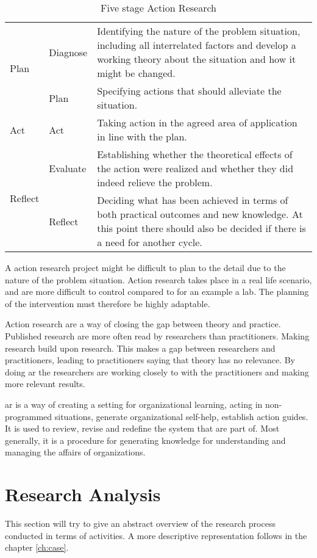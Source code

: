 \begin{table}
\begin{tabular}{m{2cm} m{2cm} m{8cm}}
\hline
\multirow{2}{*}{Plan} & Diagnose & Identifying the nature of the problem situation, including all interrelated factors and develop a working theory about the situation and how it might be changed.\\
\cline{2-3}
 & Plan & Specifying actions that should alleviate the situation. \\
\hline
Act & Act & Taking action in the agreed area of application in line with the plan.\\
\hline
\multirow{2}{*}{Reflect} & Evaluate & Establishing whether the theoretical effects of the action were realized and whether they did indeed relieve the problem. \\
\cline{2-3}
 & Reflect &  Deciding what has been achieved in terms of both practical outcomes and new knowledge. At this point there should also be decided if there is a need for another cycle. \\
\hline
\end{tabular} 
\caption{Five stage Action Research\cite{bjo:risc}}
\label{tab:5stagear}
\end{table}
A action research project might be difficult to plan to the detail due to the nature of the problem situation. 
Action research takes place in a real life scenario, and are more difficult to control compared to for an example a lab.
The planning of the intervention must therefore be highly adaptable.


Action research are a way of closing the gap between theory and practice. 
Published research are more often read by researchers than practitioners. 
Making research build upon research. 
This makes a gap between researchers and practitioners, leading to practitioners saying that theory has no relevance.
By doing \gls{ar} the researchers are working closely to with the practitioners and making more relevant results. 

\gls{ar} is a way of creating a setting for organizational learning, acting in non-programmed situations, generate organizational self-help, establish action guides. 
It is used to review, revise and redefine the system that are part of.
Most generally, it is a procedure for generating knowledge for understanding and managing the affairs of organizations.
\cite{car:rmn}
\cite{bjo:risc}
\cite{assess:susman}

\section{Research Analysis}
This section will try to give an abstract overview of the research process conducted in terms of activities. 
A more descriptive representation follows in the chapter \ref{ch:case}.  
